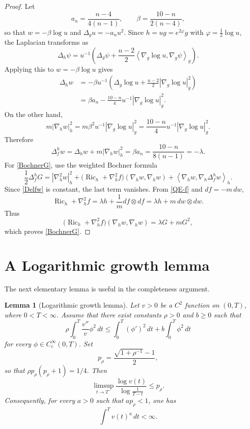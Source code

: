 \documentclass[11pt]{amsart}
\numberwithin{equation}{section}
\newtheorem{lemma}[theorem]{Lemma}
\DeclareMathOperator{\Ric}{Ric}
\newcommand{\Hess}{\nabla^2}
\newcommand{\ip}[2]{\left\langle #1,#2\right\rangle}
\newcommand{\norm}[1]{\left|#1\right|}
\begin{document}
\begin{proof}
Let
$$
        a_n=\frac{n-4}{4(n-1)},
        \qquad
        \beta=\frac{10-n}{2(n-4)},
$$
so that $w=-\beta\log u$ and $\Delta_g u=-a_nu^2$.  Since $h=ug=e^{2\varphi}g$ with $\varphi=\frac12\log u$, the Laplacian transforms as
$$
        \Delta_h \psi
        =u^{-1}\left(\Delta_g\psi+\frac{n-2}{2}\ip{\nabla_g\log u}{\nabla_g\psi}_g\right).
$$
Applying this to $w=-\beta\log u$ gives
\begin{align*}
        \Delta_h w
        &= -\beta u^{-1}\left(\Delta_g\log u+\frac{n-2}{2}\norm{\nabla_g\log u}_g^2\right) \\
        &= \beta a_n-\frac{10-n}{4}u^{-1}\norm{\nabla_g\log u}_g^2 .
\end{align*}
On the other hand,
$$
        m\norm{\nabla_h w}_h^2
        =m\beta^2u^{-1}\norm{\nabla_g\log u}_g^2
        =\frac{10-n}{4}u^{-1}\norm{\nabla_g\log u}_g^2 .
$$
Therefore
$$
        \Delta_f^h w=\Delta_h w+m\norm{\nabla_h w}_h^2
        =\beta a_n
        =\frac{10-n}{8(n-1)}=-\lambda .
$$
For \eqref{BochnerG}, use the weighted Bochner formula
$$
        \frac12\Delta_f^h G
        =\norm{\Hess_h w}_h^2+\bigl(\Ric_h+\Hess_h f\bigr)(\nabla_h w,\nabla_h w)
        +\ip{\nabla_h w}{\nabla_h\Delta_f^h w}_h .
$$
Since \eqref{Delfw} is constant, the last term vanishes.  From \eqref{QE-f} and $df=-m\,dw$,
$$
        \Ric_h+\Hess_h f=\lambda h+\frac1m df\otimes df
        =\lambda h+m\,dw\otimes dw .
$$
Thus
$$
        \bigl(\Ric_h+\Hess_h f\bigr)(\nabla_h w,\nabla_h w)
        =\lambda G+mG^2,
$$
which proves \eqref{BochnerG}.
\end{proof}

\section{A Logarithmic growth lemma}\label{sec:log}

The next elementary lemma is useful in the completeness argument.

\begin{lemma}[Logarithmic growth lemma]\label{lem:log}
Let $v>0$ be a $C^2$ function on $(0,T)$, where $0<T<\infty$.  Assume that there exist constants $\rho>0$ and $b\geq 0$ such that
\begin{equation}\label{log-assumption}
        \rho\int_0^T \frac{v''}{v}\phi^2\,dt
        \leq
        \int_0^T (\phi')^2\,dt+b\int_0^T \phi^2\,dt
\end{equation}
for every $\phi\in C_c^\infty(0,T)$.  Set
\begin{equation}\label{prho}
        p_\rho=\frac{\sqrt{1+\rho^{-1}}-1}{2},
\end{equation}
so that $\rho p_\rho(p_\rho+1)=1/4$.  Then
\begin{equation}\label{growth-conclusion}
        \limsup_{t\to T^-}
        \frac{\log v(t)}{\log \frac1{T-t}}
        \leq p_\rho .
\end{equation}
Consequently, for every $a>0$ such that $a p_\rho<1$, one has
\begin{equation}\label{integrability-conclusion}
        \int^{T} v(t)^a\,dt<\infty .
\end{equation}
\end{lemma}
\end{document}
